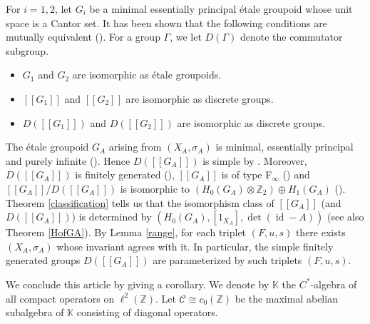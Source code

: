 \documentclass[11pt]{article}
\theoremstyle{definition}
\numberwithin{equation}{section}
\newcommand{\id}{\operatorname{id}}
\newcommand{\K}{\mathbb{K}}
\newcommand{\Z}{\mathbb{Z}}
\begin{document}
For $i=1,2$, let $G_i$ be a minimal essentially principal \'etale groupoid 
whose unit space is a Cantor set. 
It has been shown that the following conditions are mutually equivalent 
(\cite[Theorem 3.10]{Matui12}). 
For a group $\Gamma$, we let $D(\Gamma)$ denote the commutator subgroup. 
\begin{itemize}
\item $G_1$ and $G_2$ are isomorphic as \'etale groupoids. 
\item $[[G_1]]$ and $[[G_2]]$ are isomorphic as discrete groups. 
\item $D([[G_1]])$ and $D([[G_2]])$ are isomorphic as discrete groups. 
\end{itemize}
The \'etale groupoid $G_A$ arising from $(X_A,\sigma_A)$ 
is minimal, essentially principal and purely infinite 
(\cite[Lemma 6.1]{Matui12}). 
Hence $D([[G_A]])$ is simple by \cite[Theorem 4.16]{Matui12}. 
Moreover, $D([[G_A]])$ is finitely generated (\cite[Corollary 6.25]{Matui12}), 
$[[G_A]]$ is of type F$_\infty$ (\cite[Theorem 6.21]{Matui12}) and 
$[[G_A]]/D([[G_A]])$ is isomorphic to $(H_0(G_A)\otimes\Z_2)\oplus H_1(G_A)$ 
(\cite[Corollary 6.24]{Matui12}). 
Theorem \ref{classification} tells us that 
the isomorphism class of $[[G_A]]$ (and $D([[G_A]])$) is determined 
by $(H_0(G_A),[1_{X_A}],\det(\id-A))$ (see also Theorem \ref{HofGA}). 
By Lemma \ref{range}, for each triplet $(F,u,s)$ 
there exists $(X_A,\sigma_A)$ whose invariant agrees with it. 
In particular, the simple finitely generated groups $D([[G_A]])$ are 
parameterized by such triplets $(F,u,s)$. 

We conclude this article by giving a corollary. 
We denote by $\K$ 
the $C^*$-algebra of all compact operators on $\ell^2(\Z)$. 
Let $\mathcal{C}\cong c_0(\Z)$ be the maximal abelian subalgebra of $\K$ 
consisting of diagonal operators. 
\end{document}
